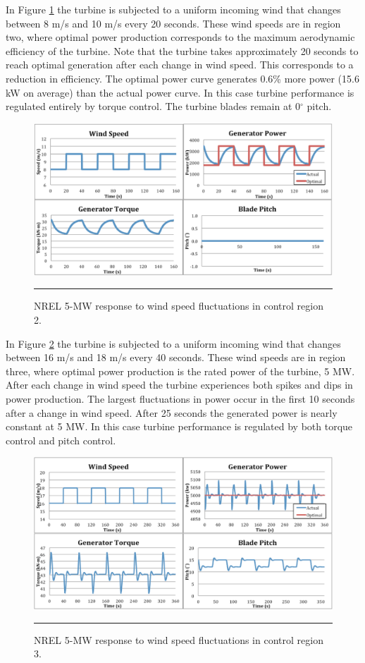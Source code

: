 In Figure \ref{fig3-3} the turbine is subjected to a uniform incoming wind that changes between 8 m/s and 10 m/s every 20 seconds. These wind speeds are in region two, where optimal power production corresponds to the maximum aerodynamic efficiency of the turbine. Note that the turbine takes approximately 20 seconds to reach optimal generation after each change in wind speed. This corresponds to a reduction in efficiency.  The optimal power curve generates 0.6\% more power (15.6 kW on average) than the actual power curve. In this case turbine performance is regulated entirely by torque control. The turbine blades remain at 0$^{\circ}$ pitch. 

\begin{figure}[htbp]
	\centering
		\includegraphics[width=\linewidth]{Figures/ch3Figures/fig3-3.png}
		\rule{35em}{0.5pt}
	\caption{NREL 5-MW response to wind speed fluctuations in control region 2.}
	\label{fig3-3}
\end{figure}

In Figure \ref{fig3-4} the turbine is subjected to a uniform incoming wind that changes between 16 m/s and 18 m/s every 40 seconds. These wind speeds are in region three, where optimal power production is the rated power of the turbine, 5 MW. After each change in wind speed the turbine experiences both spikes and dips in power production.  The largest fluctuations in power occur in the first 10 seconds after a change in wind speed. After 25 seconds the generated power is nearly constant at 5 MW.  In this case turbine performance is regulated by both torque control and pitch control. 

\begin{figure}[htbp]
	\centering
		\includegraphics[width=\linewidth]{Figures/ch3Figures/fig3-4.png}
		\rule{35em}{0.5pt}
	\caption{NREL 5-MW response to wind speed fluctuations in control region 3.}
	\label{fig3-4}
\end{figure}

